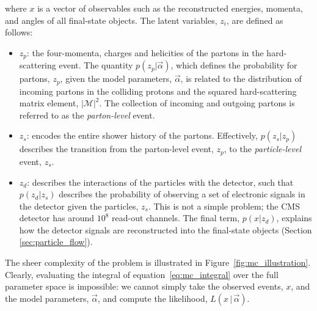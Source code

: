 \noindent
where $x$ is a vector of observables such as the reconstructed energies, momenta, and angles of all final-state objects. The latent variables, $z_i$, are defined as follows:
\begin{itemize}
    \item $z_p$: the four-momenta, charges and helicities of the partons in the hard-scattering event. The quantity $p(z_p|\vec{\alpha})$, which defines the probability for partons, $z_p$, given the model parameters, $\vec{\alpha}$, is related to the distribution of incoming partons in the colliding protons and the squared hard-scattering matrix element, $|\mathcal{M}|^2$. The collection of incoming and outgoing partons is referred to as the \textit{parton-level} event.
    \item $z_s$: encodes the entire shower history of the partons. Effectively, $p(z_s|z_p)$ describes the transition from the parton-level event, $z_p$, to the \textit{particle-level} event, $z_s$.
    \item $z_d$: describes the interactions of the particles with the detector, such that $p(z_d|z_s)$ describes the probability of observing a set of electronic signals in the detector given the particles, $z_s$. This is not a simple problem; the CMS detector has around $10^8$ read-out channels. The final term, $p(x|z_d)$, explains how the detector signals are reconstructed into the final-state objects (Section \ref{sec:particle_flow}).
\end{itemize} 

The sheer complexity of the problem is illustrated in Figure~\ref{fig:mc_illustration}. Clearly, evaluating the integral of equation~\ref{eq:mc_integral} over the full parameter space is impossible: we cannot simply take the observed events, $x$, and the model parameters, $\vec{\alpha}$, and compute the likelihood, $L(x\,|\,\vec{\alpha})$.

